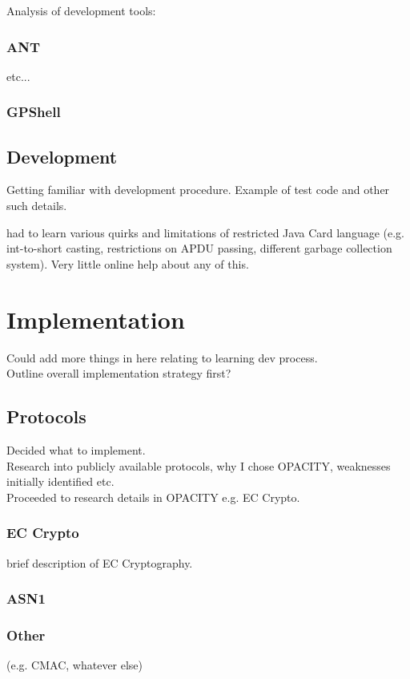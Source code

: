 \documentclass[12pt]{article}
\begin{document}
Analysis of development tools:
\subsubsection{ANT}
etc...
\subsubsection{GPShell}

\subsection{Development}
Getting familiar with development procedure. Example of test code and other such details.







had to learn various quirks and limitations of restricted Java Card language (e.g. int-to-short casting, restrictions on APDU passing, different garbage collection system). Very little online help about any of this.\\


\pagebreak




\section{Implementation}
Could add more things in here relating to learning dev process.\\
Outline overall implementation strategy first?

\subsection{Protocols}
Decided what to implement.\\
Research into publicly available protocols, why I chose OPACITY, weaknesses initially identified etc.\\
Proceeded to research details in OPACITY e.g. EC Crypto.
\subsubsection{EC Crypto}
brief description of EC Cryptography.
\subsubsection{ASN1}
\subsubsection{Other}
(e.g. CMAC, whatever else)
\end{document}
